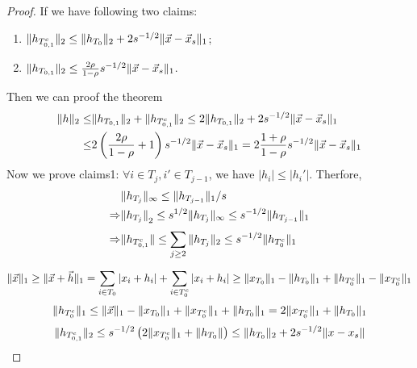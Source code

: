\begin{theorem}
\begin{proof}
        If we have following two claims:
        \begin{enumerate}
            \item $ \Arrowvert h_{T^c_{0,1}} \Arrowvert_2 \le \Arrowvert h_{T_0} \Arrowvert_2 + 2s^{-1/2} \Arrowvert \vec{x} - \vec{x}_s \Arrowvert_1 $;
                \item $ \Arrowvert h_{T_{0,1}} \Arrowvert_2 \le \frac{2\rho}{1-\rho} s^{-1/2} \Arrowvert \vec{x} - \vec{x}_s \Arrowvert_1 $.
        \end{enumerate}
        Then we can proof the theorem
        \begin{align*}
            \Arrowvert h \Arrowvert_2 \le& \Arrowvert h_{T_{0,1}} \Arrowvert_2 + \Arrowvert h_{T^{c}_{0,1}} \Arrowvert_2 \le 2 \Arrowvert h_{T_{0,1}} \Arrowvert_2 + 2 s^{-1/2} \Arrowvert \vec{x} - \vec{x}_s \Arrowvert_1 \\
            \le& 2 \left( \frac{2\rho}{1 - \rho} + 1 \right) s^{-1/2} \Arrowvert \vec{x} - \vec{x}_s \Arrowvert_1
            = 2 \frac{1 + \rho}{1 - \rho} s ^{-1/2} \Arrowvert \vec{x} - \vec{x}_s \Arrowvert_1
        \end{align*}
        Now we prove claims1:
        $ \forall i \in T_j, i' \in T_{j-1} $, we have $ \left| h_i \right| \le \left| h_i' \right| $. Therfore, 
        \begin{align*}
           &\Arrowvert h_{T_j} \Arrowvert_\infty \le \Arrowvert h_{T_{j-1}} \Arrowvert_1 /s  \\
           \Rightarrow& {\Arrowvert h_{T_j} \Arrowvert}_2 \le s^{1/2} \Arrowvert h_{T_j} \Arrowvert_\infty \le s^{-1/2} \Arrowvert h_{T_{j-1}} \Arrowvert_1 \\
            \Rightarrow& \Arrowvert h_{T^{c}_{0,1}} \Arrowvert\le \sum^{}_{j\ge 2} \Arrowvert h_{T_j} \Arrowvert_2 \le s^{-1/2} \Arrowvert h_{T_0^c} \Arrowvert_1 
        \end{align*}
        \[
            \Arrowvert \vec{x} \Arrowvert_1 \ge \Arrowvert \vec{x} + \vec{h} \Arrowvert_1 = \sum^{}_{i \in T_0} \left| x_i + h_i \right| + \sum^{}_{i \in T^c_{0}} \left| x_i + h_i \right| \ge \Arrowvert x_{T_0} \Arrowvert_1 - \Arrowvert h_{T_0} \Arrowvert_1 + \Arrowvert h_{T^c_{0}} \Arrowvert_1 - \Arrowvert x_{T^c_0} \Arrowvert_1
        \]
        \[
            \Arrowvert h_{T^c_{0}} \Arrowvert_1 \le \Arrowvert \vec{x} \Arrowvert_1 - \Arrowvert x_{T_0} \Arrowvert_1 + \Arrowvert x_{T^c_0} \Arrowvert_1 + \Arrowvert h_{T_0} \Arrowvert_1 = 2 \Arrowvert x_{T^c_0} \Arrowvert_1 + \Arrowvert h_{T_0} \Arrowvert_1
        \]
        \[
            \Arrowvert h_{T^c_{0,1}} \Arrowvert_2 \le s^{-1/2} \left( 2 \Arrowvert x_{T^c_{0}} \Arrowvert_1 + \Arrowvert h_{T_0} \Arrowvert \right) \le \Arrowvert h_{T_0} \Arrowvert_2 + 2s^{-1/2} \Arrowvert x - x_s \Arrowvert
\]
\end{proof}
\end{theorem}

